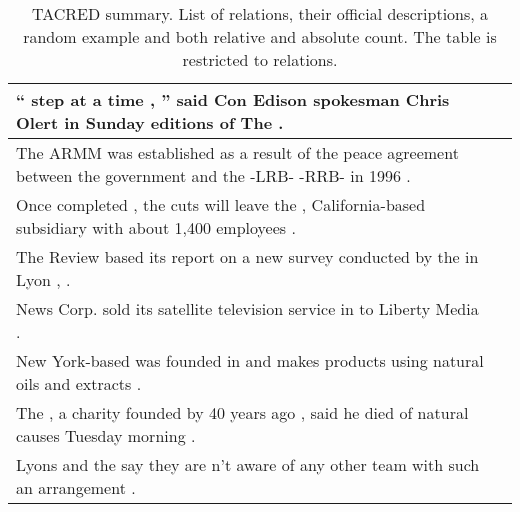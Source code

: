 \begin{longtable}{p{} P{1,3cm} }

\caption{TACRED summary. List of relations, their official descriptions, a random example and both relative and absolute count. The table is restricted to  relations.}\\

\hline
\hline
{}  {`` \underline{} step at a time , '' said Con Edison spokesman Chris Olert in Sunday editions of The \underline{} .} &    \\ 
\hline
{}  {The ARMM was established as a result of the peace agreement between the government and the \underline{} -LRB- \underline{} -RRB- in 1996 .} &    \\ 
\hline
{}  {Once completed , the cuts will leave the \underline{} , California-based \underline{} subsidiary with about 1,400 employees .} &    \\ 
\hline
{}  {The Review based its report on a new survey conducted by the \underline{} in Lyon , \underline{} .} &    \\ 
\hline
{}  {News Corp. sold its satellite television service \underline{} in \underline{} to Liberty Media .} &    \\ 
\hline
{}  {New York-based \underline{} was founded in \underline{} and makes products using natural oils and extracts .} &    \\ 
\hline
{}  {The \underline{} , a charity founded by \underline{} 40 years ago , said he died of natural causes Tuesday morning .} &    \\ 
\hline
{}  {Lyons and the \underline{} say they are n't aware of any other \underline{} team with such an arrangement .} &    \\ 
\hline

\end{longtable}
